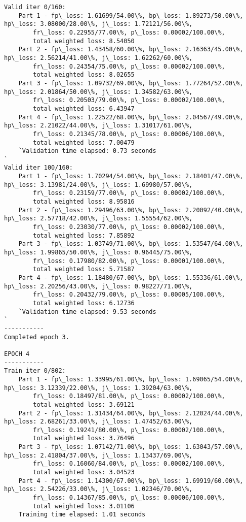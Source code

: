 \documentclass[11pt]{article}
\begin{document}
\begin{Verbatim}[commandchars=\\\{\}]
Valid iter 0/160:
	Part 1 - fp\_loss: 1.61699/54.00\%, bp\_loss: 1.89273/50.00\%, hp\_loss: 3.08000/28.00\%, j\_loss: 1.72121/56.00\%, 
		fr\_loss: 0.22955/77.00\%, p\_loss: 0.00002/100.00\%, 
		total weighted loss: 8.54050
	Part 2 - fp\_loss: 1.43458/60.00\%, bp\_loss: 2.16363/45.00\%, hp\_loss: 2.56214/41.00\%, j\_loss: 1.62262/60.00\%, 
		fr\_loss: 0.24354/75.00\%, p\_loss: 0.00002/100.00\%, 
		total weighted loss: 8.02655
	Part 3 - fp\_loss: 1.09732/69.00\%, bp\_loss: 1.77264/52.00\%, hp\_loss: 2.01864/50.00\%, j\_loss: 1.34582/63.00\%, 
		fr\_loss: 0.20503/79.00\%, p\_loss: 0.00002/100.00\%, 
		total weighted loss: 6.43947
	Part 4 - fp\_loss: 1.22522/68.00\%, bp\_loss: 2.04567/49.00\%, hp\_loss: 2.21022/44.00\%, j\_loss: 1.31017/61.00\%, 
		fr\_loss: 0.21345/78.00\%, p\_loss: 0.00006/100.00\%, 
		total weighted loss: 7.00479
	`Validation time elapsed: 0.73 seconds
`
Valid iter 100/160:
	Part 1 - fp\_loss: 1.70294/54.00\%, bp\_loss: 2.18401/47.00\%, hp\_loss: 3.13981/24.00\%, j\_loss: 1.69980/57.00\%, 
		fr\_loss: 0.23159/77.00\%, p\_loss: 0.00002/100.00\%, 
		total weighted loss: 8.95816
	Part 2 - fp\_loss: 1.29496/63.00\%, bp\_loss: 2.20092/40.00\%, hp\_loss: 2.57718/42.00\%, j\_loss: 1.55554/62.00\%, 
		fr\_loss: 0.23030/77.00\%, p\_loss: 0.00002/100.00\%, 
		total weighted loss: 7.85892
	Part 3 - fp\_loss: 1.03749/71.00\%, bp\_loss: 1.53547/64.00\%, hp\_loss: 1.99865/50.00\%, j\_loss: 0.96445/75.00\%, 
		fr\_loss: 0.17980/82.00\%, p\_loss: 0.00001/100.00\%, 
		total weighted loss: 5.71587
	Part 4 - fp\_loss: 1.18480/67.00\%, bp\_loss: 1.55336/61.00\%, hp\_loss: 2.20256/43.00\%, j\_loss: 0.98227/71.00\%, 
		fr\_loss: 0.20432/79.00\%, p\_loss: 0.00005/100.00\%, 
		total weighted loss: 6.12736
	`Validation time elapsed: 9.53 seconds
`
-----------
Completed epoch 3.

EPOCH 4
-----------
Train iter 0/802:
	Part 1 - fp\_loss: 1.33995/61.00\%, bp\_loss: 1.69065/54.00\%, hp\_loss: 3.12339/22.00\%, j\_loss: 1.39204/63.00\%, 
		fr\_loss: 0.18497/81.00\%, p\_loss: 0.00002/100.00\%, 
		total weighted loss: 3.69121
	Part 2 - fp\_loss: 1.31434/64.00\%, bp\_loss: 2.12024/44.00\%, hp\_loss: 2.68261/33.00\%, j\_loss: 1.47452/63.00\%, 
		fr\_loss: 0.19241/80.00\%, p\_loss: 0.00002/100.00\%, 
		total weighted loss: 3.76496
	Part 3 - fp\_loss: 1.07142/71.00\%, bp\_loss: 1.63043/57.00\%, hp\_loss: 2.41804/37.00\%, j\_loss: 1.13437/69.00\%, 
		fr\_loss: 0.16060/84.00\%, p\_loss: 0.00002/100.00\%, 
		total weighted loss: 3.04523
	Part 4 - fp\_loss: 1.14300/67.00\%, bp\_loss: 1.69919/60.00\%, hp\_loss: 2.54226/33.00\%, j\_loss: 1.02346/70.00\%, 
		fr\_loss: 0.14367/85.00\%, p\_loss: 0.00006/100.00\%, 
		total weighted loss: 3.01106
	Training time elapsed: 1.01 seconds


\end{Verbatim}
\end{document}

